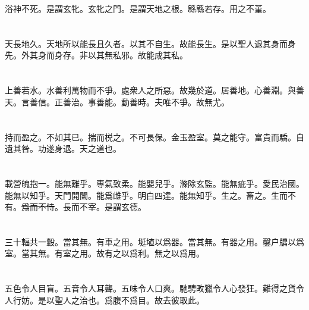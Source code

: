\documentclass[a5paper]{ctexbook}
\newcommand{\he}[1]{\textcolor[RGB]{255,0,255}{#1}}
\newcommand{\bo}[1]{\textcolor[RGB]{0,255,255}{#1}}
\newcommand{\jian}[1]{\textcolor[RGB]{0,255,0}{#1}}
\def\del{\sout}
\begin{document}
    \bo{浴}神不死。是謂玄牝。玄牝之門。是謂天地\bo{之}根。緜緜若存。用之不\bo{堇}。

    \chapter{}

    天長地久。天地所以能長且久者。以其不自生。故能長生。是以聖人\bo{退}其身而身先。外其身而身存。非以其無私邪。故能成其私。

    \chapter{}

    上善若水。水善利萬物而不爭。處衆人之所惡。故幾於道。居善地。心善淵。與善\bo{天}。言善信。正善治。事善能。動善時。夫唯不爭。故無尤。

    \chapter{}

    持而盈之。不如其已。揣而棁之。不可長保。金玉\bo{盈室}。莫之能守。富貴而驕。自遺其咎。功遂身退。天之道\jian{也}。

    \chapter{}

    載營魄抱一。能無離乎。專氣致柔。能嬰兒乎。滌除玄\bo{監}。能無疵乎。愛民治國。能\bo{無以知}乎。天門開闔。能\bo{爲雌}乎。明白四達。能\he{無知}乎。生之。畜之。生而不有。\bo{\del{爲而不恃}}。長而不宰。是謂玄德。

    \chapter{}

    三十輻共一轂。當其無。有車之用。埏埴以爲器。當其無。有器之用。鑿户牖以爲室。當其無。有室之用。故有之以爲利。無之以爲用。

    \chapter{}

    五色令人目盲。五音令人耳聾。五味令人口爽。馳騁畋獵令人心發狂。難得之貨令人行妨。\bo{是以聖人之治也。爲腹不爲目}。故去彼取此。

    \chapter{}
\end{document}
